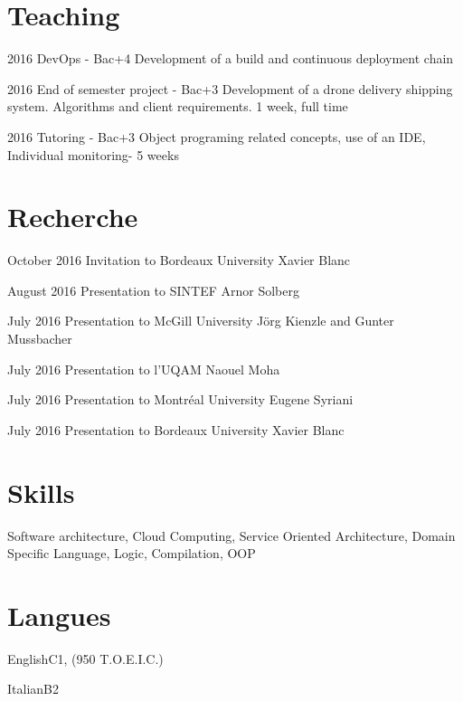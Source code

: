 \documentclass{tccv}
\begin{document}
\section{Teaching}

\begin{yearlist}

\item{2016}
     {DevOps - Bac+4}
     {Development of a build and continuous deployment chain}

\item{2016}
     {End of semester project - Bac+3}
     {Development of a drone delivery shipping system. Algorithms and client requirements. 1 week, full time}

\item{2016}
     {Tutoring  - Bac+3}
     {Object programing related concepts, use of an IDE, Individual monitoring- 5 weeks}

\end{yearlist}

\section{Recherche}

\begin{yearlist}
      
\item{October 2016}
     {Invitation to Bordeaux University}
     {Xavier Blanc}
      
\item{August 2016}
     {Presentation to SINTEF}
     {Arnor Solberg}

\item{July 2016}
     {Presentation to McGill University}
     {J\"org Kienzle and Gunter Mussbacher}

\item{July 2016}
     {Presentation to l'UQAM}
     {Naouel Moha}

\item{July 2016}
     {Presentation to  Montr\'eal University}
     {Eugene Syriani}
     
\item{July 2016}
     {Presentation to Bordeaux University}
     {Xavier Blanc}     

\end{yearlist}
\vspace{-6pt} %

\section{Skills}
Software architecture, Cloud Computing, Service Oriented Architecture, Domain Specific Language, Logic, Compilation, OOP


\section{Langues}

\begin{factlist}
\item{English}{C1, (950 T.O.E.I.C.)}
\item{Italian}{B2}
\end{factlist}
\end{document}
